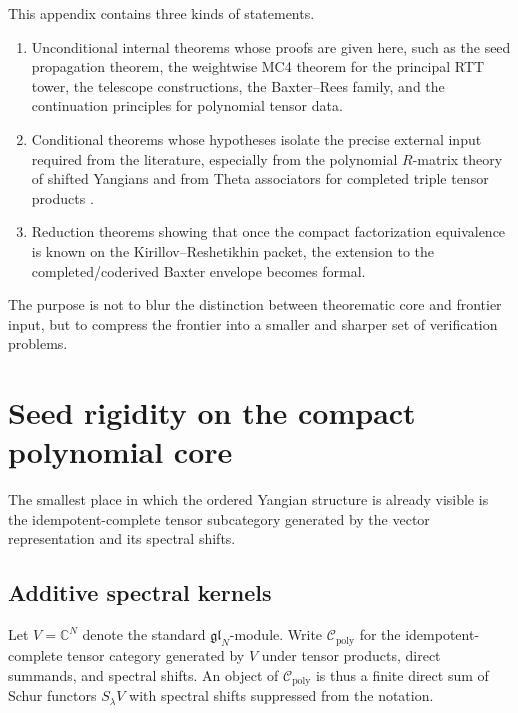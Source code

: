 \begin{remark}
\label{rem:typeA-status-scope}
This appendix contains three kinds of statements.
\begin{enumerate}
 \item Unconditional internal theorems whose proofs are given here,
 such as the seed propagation theorem, the weightwise MC4 theorem for
 the principal RTT tower, the telescope constructions, the
 Baxter--Rees family, and the continuation principles for polynomial
 tensor data.
 \item Conditional theorems whose hypotheses isolate the precise
 external input required from the literature, especially from the
 polynomial $R$-matrix theory of shifted Yangians and from Theta
 associators for completed triple tensor products
 \cite{HZ24,ZhangTheta24}.
 \item Reduction theorems showing that once the compact factorization
 equivalence is known on the Kirillov--Reshetikhin packet, the
 extension to the completed/coderived Baxter envelope becomes formal.
\end{enumerate}
The purpose is not to blur the distinction between theorematic core and
frontier input, but to compress the frontier into a smaller and sharper
set of verification problems.
\end{remark}

\section{Seed rigidity on the compact polynomial core}
\label{sec:typeA-seed-rigidity}

The smallest place in which the ordered Yangian structure is already
visible is the idempotent-complete tensor subcategory generated by the
vector representation and its spectral shifts.

\subsection{Additive spectral kernels}

Let $V=\mathbb C^N$ denote the standard $\mathfrak{gl}_N$-module. Write
$\mathcal C_{\mathrm{poly}}$ for the idempotent-complete tensor category
generated by $V$ under tensor products, direct summands, and spectral
shifts. An object of $\mathcal C_{\mathrm{poly}}$ is thus a finite direct
sum of Schur functors $S_\lambda V$ with spectral shifts suppressed from
the notation.

